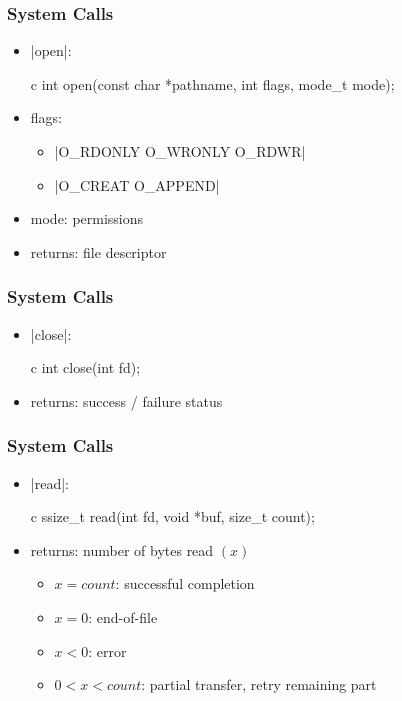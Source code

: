 \documentclass[dvipsnames]{beamer}
\begin{document}
\begin{frame}[fragile]
  \frametitle{System Calls}

  \begin{itemize}
    \item {}|open|:
    \begin{pygments}{c}
int open(const char *pathname,
         int flags,
         mode_t mode);
    \end{pygments}

    \item flags:
    \begin{itemize}
      \item {}|O_RDONLY O_WRONLY O_RDWR|
      \item {}|O_CREAT O_APPEND|
    \end{itemize}

    \item mode: permissions

    \item returns: file descriptor
  \end{itemize}
\end{frame}

\begin{frame}[fragile]
  \frametitle{System Calls}

  \begin{itemize}
    \item {}|close|:
    \begin{pygments}{c}
int close(int fd);
    \end{pygments}
    \item returns: success / failure status
  \end{itemize}
\end{frame}

\begin{frame}[fragile]
  \frametitle{System Calls}

  \begin{itemize}
    \item {}|read|:
    \begin{pygments}{c}
ssize_t read(int fd,
             void *buf,
             size_t count);
    \end{pygments}
    \item returns: number of bytes read $(x)$
    \begin{itemize}
      \item $x=count$: successful completion
      \item $x=0$: end-of-file
      \item $x<0$: error
      \item $0<x<count$: partial transfer, retry remaining part
    \end{itemize}
  \end{itemize}
\end{frame}
\end{document}
